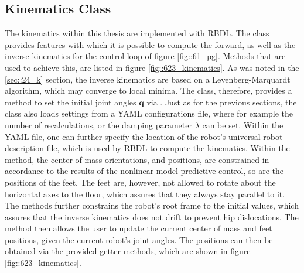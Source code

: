 \subsection{Kinematics Class}
The kinematics within this thesis are implemented with RBDL. The  class provides features with which it is possible to compute the forward, as well as the inverse kinematics for the control loop of figure \ref{fig::61_pg}. Methods that are used to achieve this, are listed in figure \ref{fig::623_kinematics}. As was noted in the \ref{sec::24_k} section, the inverse kinematics are based on a Levenberg-Marquardt algorithm, which may converge to local minima. The  class, therefore, provides a method to set the initial joint angles $\bm{q}$ via . Just as for the previous sections, the  class also loads settings from a YAML configurations file, where for example the number of recalculations, or the damping parameter $\lambda$ can be set. Within the YAML file, one can further specify the location of the robot's universal robot description file, which is used by RBDL to compute the kinematics. Within the  method, the center of mass orientations, and positions, are constrained in accordance to the results of the nonlinear model predictive control, so are the positions of the feet. The feet are, however, not allowed to rotate about the horizontal axes to the floor, which assures that they always stay parallel to it. The methods further constrains the robot's root frame to the initial values, which assures that the inverse kinematics does not drift to prevent hip dislocations. The  method then allows the user to update the current center of mass and feet positions, given the current robot's joint angles. The positions can then be obtained via the provided getter methods, which are shown in figure \ref{fig::623_kinematics}.
